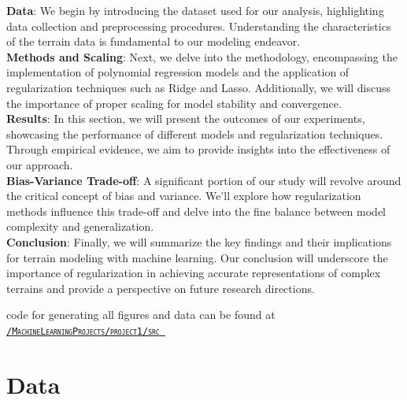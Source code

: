 \documentclass[twoside,11pt]{report}
\begin{document}
\textbf{Data}: We begin by introducing the dataset used for our analysis, highlighting data collection and preprocessing procedures. 
Understanding the characteristics of the terrain data is fundamental to our modeling endeavor.\\
\textbf{Methods and Scaling}: Next, we delve into the methodology, encompassing the implementation of polynomial regression 
models and the application of regularization techniques such as Ridge and Lasso. Additionally, we will discuss the 
importance of proper scaling for model stability and convergence.\\
\textbf{Results}: In this section, we will present the outcomes of our experiments, showcasing the performance of different 
models and regularization techniques. Through empirical evidence, we aim to provide insights into the effectiveness of our approach.\\
\textbf{Bias-Variance Trade-off}: A significant portion of our study will revolve around the critical concept of bias and 
variance. We'll explore how regularization methods influence this trade-off and delve into the fine balance between 
model complexity and generalization.\\
\textbf{Conclusion}: Finally, we will summarize the key findings and their implications for terrain modeling with machine learning. 
Our conclusion will underscore the importance of regularization in achieving accurate representations of complex terrains and 
provide a perspective on future research directions.

\begin{center}
    \scriptsize code for generating all figures and data can be found at 
\href{https://github.com/bragewiseth/MachineLearningProjects/tree/main/project1/src}{\tt \textsc{/MachineLearningProjects/project1/src} }
\end{center}








\section{Data}
\label{sec:data}
\end{document}
